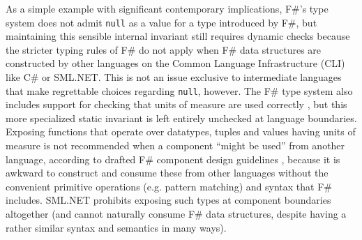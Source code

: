 As a simple example with significant contemporary implications, F\#'s type system does not admit \verb|null| as a value for a type introduced by F\#, but maintaining this sensible internal invariant still requires dynamic  checks because the stricter typing rules of F\# do not apply when F\# data structures are constructed by other languages on the Common Language Infrastructure (CLI) like C\# or SML.NET. This is not an issue exclusive to intermediate languages that make regrettable choices regarding \verb|null|, however. The F\# type system also includes support for checking that units of measure are used correctly \cite{syme2012expert, kennedy1994dimension}, but this more specialized static invariant is left entirely unchecked at language boundaries. Exposing functions that operate over datatypes, tuples and values having units of measure is not recommended when a component ``might be used'' from another language, according to drafted F\# component design guidelines \cite{fsharpguidelines}, because it is awkward to construct and consume these from other languages without the convenient primitive operations (e.g. pattern matching) and syntax that F\# includes. SML.NET prohibits exposing such types at component boundaries altogether (and cannot naturally consume F\# data structures, despite having a rather similar syntax and semantics in many ways). 

